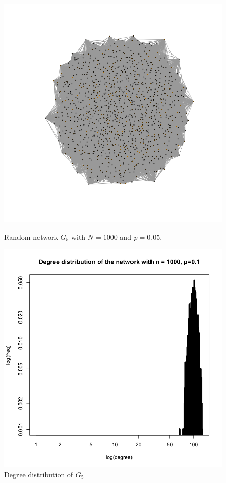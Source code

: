 \documentclass[draftcls,12pt,onecolumn]{IEEEtran}
\begin{document}
\begin{figure}[H]
\centering
\begin{minipage}[t]{0.48\textwidth}
\centering
\includegraphics[scale=0.2]{figures_part1_1/output_7_0.png}
\caption{Random network $G_5$ with $N=1000$ and $p=0.05$.}
\label{fig1}
\end{minipage}
\begin{minipage}[t]{0.48\textwidth}
\centering
\includegraphics[scale=0.2]{figures_part1_1/output_12_1.png}
\caption{Degree distribution of $G_5$}
\label{fig2}
\end{minipage}
\end{figure}
\end{document}
